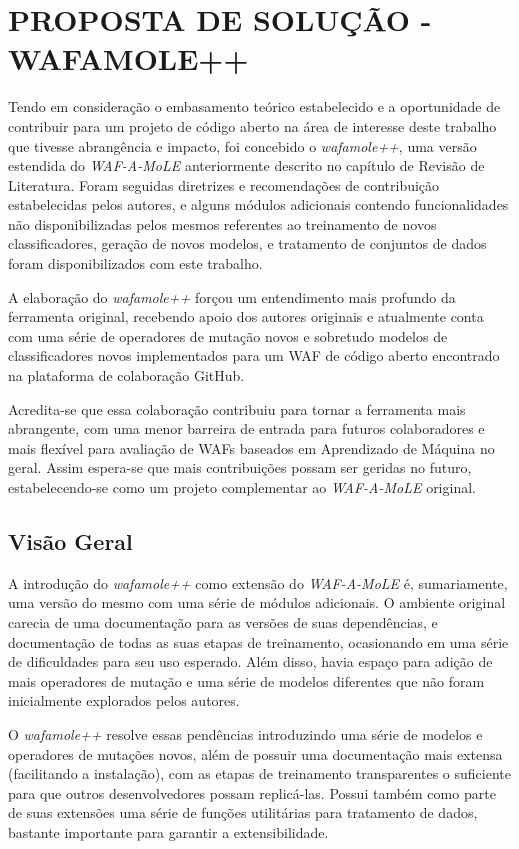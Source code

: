 \chapter{PROPOSTA DE SOLUÇÃO - WAFAMOLE++}
\label{chp:capitulo4}

Tendo em consideração o embasamento teórico estabelecido e a oportunidade de contribuir para um projeto de código aberto na área de interesse deste trabalho que tivesse abrangência e impacto, foi concebido o \textit{wafamole++}, uma versão estendida do \textit{WAF-A-MoLE} anteriormente descrito no capítulo de Revisão de Literatura. Foram seguidas diretrizes e recomendações de contribuição estabelecidas pelos autores, e alguns módulos adicionais contendo funcionalidades não disponibilizadas pelos mesmos referentes ao treinamento de novos classificadores, geração de novos modelos, e tratamento de conjuntos de dados foram disponibilizados com este trabalho.

A elaboração do \textit{wafamole++} forçou um entendimento mais profundo da ferramenta original, recebendo apoio dos autores originais e atualmente conta com uma série de operadores de mutação novos e sobretudo modelos de classificadores novos implementados para um WAF de código aberto encontrado na plataforma de colaboração GitHub.

Acredita-se que essa colaboração contribuiu para tornar a ferramenta mais abrangente, com uma menor barreira de entrada para futuros colaboradores e mais flexível para avaliação de WAFs baseados em Aprendizado de Máquina no geral. Assim espera-se que mais contribuições possam ser geridas no futuro, estabelecendo-se como um projeto complementar ao \textit{WAF-A-MoLE} original.

\section{Visão Geral}
A introdução do \textit{wafamole++} como extensão do \textit{WAF-A-MoLE} é, sumariamente, uma versão do mesmo com uma série de módulos adicionais. O ambiente original carecia de uma documentação para as versões de suas dependências, e documentação de todas as suas etapas de treinamento, ocasionando em uma série de dificuldades para seu uso esperado. Além disso, havia espaço para adição de mais operadores de mutação e uma série de modelos diferentes que não foram inicialmente explorados pelos autores.

O \textit{wafamole++} resolve essas pendências introduzindo uma série de modelos e operadores de mutações novos, além de possuir uma documentação mais extensa (facilitando a instalação), com as etapas de treinamento transparentes o suficiente para que outros desenvolvedores possam replicá-las. Possui também como parte de suas extensões uma série de funções utilitárias para tratamento de dados, bastante importante para garantir a extensibilidade. 

